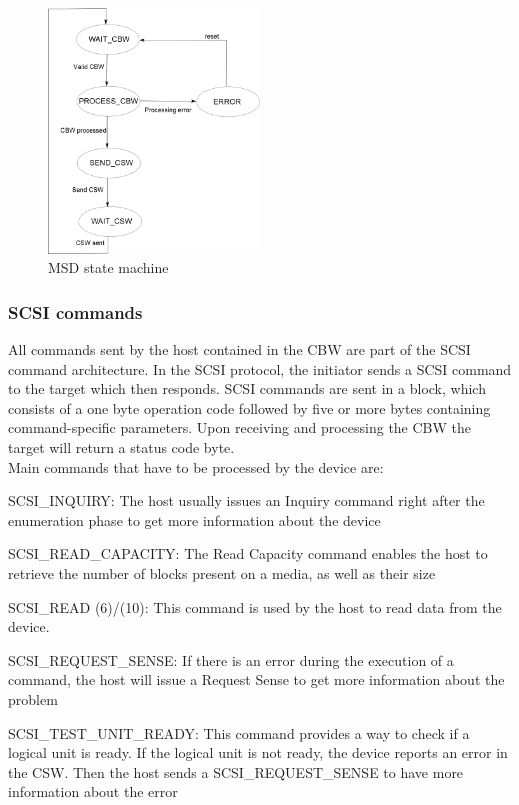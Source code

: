 \documentclass[pdftex,10pt,a4paper]{report}
\newenvironment{packed_item}{
\begin{itemize}
  \setlength{\itemsep}{1pt}
  \setlength{\parskip}{0pt}
  \setlength{\parsep}{0pt}
}{\end{itemize}}
\begin{document}
\begin{figure}[h!]
		\centering
		\includegraphics[width=0.5\textwidth]{./msd_state_machine.png}
		\caption{MSD state machine}
		\label{MSD state machine}
\end{figure}


\subsubsection{SCSI commands}
All commands sent by the host contained in the CBW are part of the SCSI command architecture. In the SCSI protocol, the initiator sends a SCSI command to the target which then responds. SCSI commands are sent in a block, which consists of a one byte operation code followed by five or more bytes containing command-specific parameters. Upon receiving and processing the CBW the target will return a status code byte.\\


Main commands that have to be processed by the device are:
\begin{packed_item}
	\item SCSI\_INQUIRY: The host usually issues an Inquiry command right after the enumeration phase to get more
information about the device

	\item SCSI\_READ\_CAPACITY: The Read Capacity command enables the host to retrieve the number of blocks present on a
media, as well as their size

	\item SCSI\_READ (6)/(10): This command is used by the host to read data from the device.
	
	\item SCSI\_REQUEST\_SENSE: If there is an error during the execution of a command, the host will issue a
Request Sense to get more information about the problem

	\item SCSI\_TEST\_UNIT\_READY: This command provides a way to check if a logical unit is ready. If the logical unit is not ready, the device reports an error in the CSW. Then the host sends a SCSI\_REQUEST\_SENSE to have more information about the error
\end{packed_item}
\end{document}
